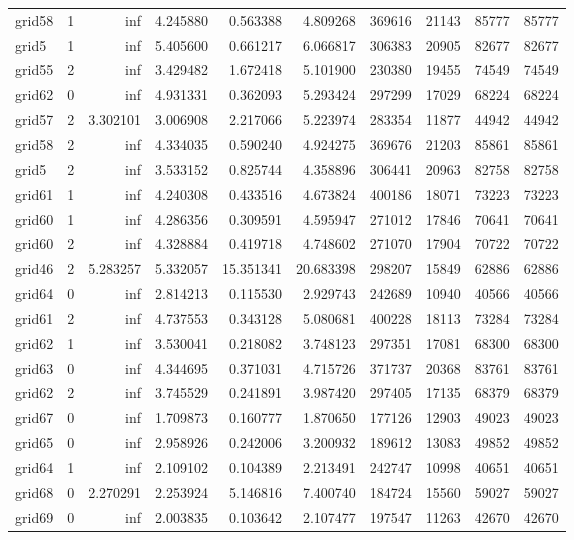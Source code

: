 \begin{longtable}{|l|r|r|r|r|r|r|r|r|r|}
grid58 & 1 & inf & 4.245880 & 0.563388 & 4.809268 & 369616 & 21143 & 85777 & 85777 \\
grid5 & 1 & inf & 5.405600 & 0.661217 & 6.066817 & 306383 & 20905 & 82677 & 82677 \\
grid55 & 2 & inf & 3.429482 & 1.672418 & 5.101900 & 230380 & 19455 & 74549 & 74549 \\
grid62 & 0 & inf & 4.931331 & 0.362093 & 5.293424 & 297299 & 17029 & 68224 & 68224 \\
grid57 & 2 & 3.302101 & 3.006908 & 2.217066 & 5.223974 & 283354 & 11877 & 44942 & 44942 \\
grid58 & 2 & inf & 4.334035 & 0.590240 & 4.924275 & 369676 & 21203 & 85861 & 85861 \\
grid5 & 2 & inf & 3.533152 & 0.825744 & 4.358896 & 306441 & 20963 & 82758 & 82758 \\
grid61 & 1 & inf & 4.240308 & 0.433516 & 4.673824 & 400186 & 18071 & 73223 & 73223 \\
grid60 & 1 & inf & 4.286356 & 0.309591 & 4.595947 & 271012 & 17846 & 70641 & 70641 \\
grid60 & 2 & inf & 4.328884 & 0.419718 & 4.748602 & 271070 & 17904 & 70722 & 70722 \\
grid46 & 2 & 5.283257 & 5.332057 & 15.351341 & 20.683398 & 298207 & 15849 & 62886 & 62886 \\
grid64 & 0 & inf & 2.814213 & 0.115530 & 2.929743 & 242689 & 10940 & 40566 & 40566 \\
grid61 & 2 & inf & 4.737553 & 0.343128 & 5.080681 & 400228 & 18113 & 73284 & 73284 \\
grid62 & 1 & inf & 3.530041 & 0.218082 & 3.748123 & 297351 & 17081 & 68300 & 68300 \\
grid63 & 0 & inf & 4.344695 & 0.371031 & 4.715726 & 371737 & 20368 & 83761 & 83761 \\
grid62 & 2 & inf & 3.745529 & 0.241891 & 3.987420 & 297405 & 17135 & 68379 & 68379 \\
grid67 & 0 & inf & 1.709873 & 0.160777 & 1.870650 & 177126 & 12903 & 49023 & 49023 \\
grid65 & 0 & inf & 2.958926 & 0.242006 & 3.200932 & 189612 & 13083 & 49852 & 49852 \\
grid64 & 1 & inf & 2.109102 & 0.104389 & 2.213491 & 242747 & 10998 & 40651 & 40651 \\
grid68 & 0 & 2.270291 & 2.253924 & 5.146816 & 7.400740 & 184724 & 15560 & 59027 & 59027 \\
grid69 & 0 & inf & 2.003835 & 0.103642 & 2.107477 & 197547 & 11263 & 42670 & 42670 \\

\end{longtable}
